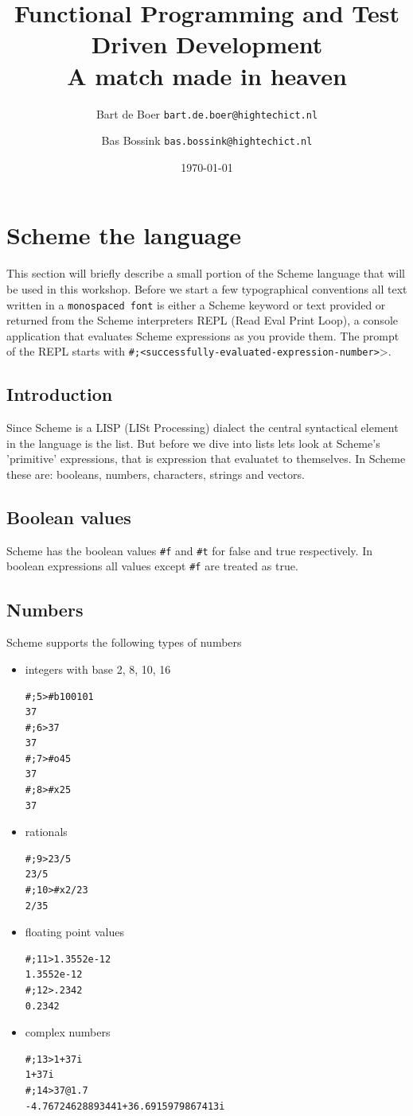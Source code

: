 \documentclass[12pt,a4paper,english,twoside]{article}
\author{
    Bart de Boer \texttt{bart.de.boer@hightechict.nl}
    \and
    Bas Bossink \texttt{bas.bossink@hightechict.nl}
}
\date{\today}
\title{Functional Programming and Test Driven Development\\
\vspace{2 mm} {\large A match made in heaven}}
\begin{document}
\maketitle
\section{Scheme the language}
This section will briefly describe a small portion of the Scheme language that will be used in this workshop.
Before we start a few typographical conventions all text written in a 
\texttt{monospaced font} is either a Scheme keyword or text provided or 
returned from the Scheme interpreters REPL (Read Eval Print Loop), a console 
application that evaluates Scheme expressions as you provide them. The prompt 
of the REPL starts with \texttt{\#;<successfully-evaluated-expression-number>$\texttt{>}$}.
\subsection{Introduction}
Since Scheme is a LISP (LISt Processing) dialect the central syntactical element in the language is the list. But before we dive into lists lets look at Scheme's 'primitive' expressions, that is expression that evaluatet to themselves. In Scheme these are: booleans, numbers, characters, strings and vectors.
\subsection{Boolean values}
Scheme has the boolean values \texttt{\#f} and \texttt{\#t} for false and true 
respectively. In boolean expressions all values except \texttt{\#f} are treated 
as true.
\subsection{Numbers}
Scheme supports the following types of numbers
\begin{itemize}
\item integers with base 2, 8, 10, 16
\begin{lstlisting}
#;5>#b100101
37
#;6>37
37
#;7>#o45
37
#;8>#x25
37
\end{lstlisting}
\item rationals
\begin{lstlisting}
#;9>23/5
23/5
#;10>#x2/23 
2/35
\end{lstlisting}
\item floating point values
\begin{lstlisting}
#;11>1.3552e-12
1.3552e-12 
#;12>.2342
0.2342
\end{lstlisting}
\item complex numbers
\begin{lstlisting}
#;13>1+37i
1+37i
#;14>37@1.7
-4.76724628893441+36.6915979867413i
\end{lstlisting}
\end{itemize}
\end{document}
